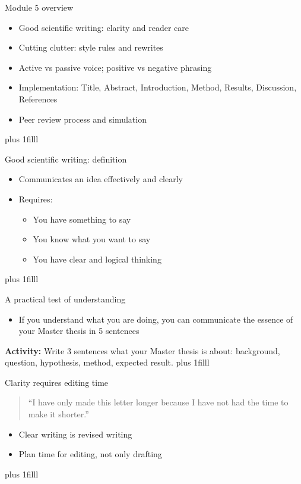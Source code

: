 \documentclass[aspectratio=169]{beamer}
\newcommand{\btVFill}{\vskip0pt plus 1filll}
\newcommand{\Activity}[1]{\textbf{Activity:} #1}
\begin{document}
\begin{frame}{Module 5 overview}
  \begin{itemize}
    \item Good scientific writing: clarity and reader care
    \item Cutting clutter: style rules and rewrites
    \item Active vs passive voice; positive vs negative phrasing
    \item Implementation: Title, Abstract, Introduction, Method, Results, Discussion, References
    \item Peer review process and simulation
  \end{itemize}
  \btVFill
\end{frame}


\begin{frame}{Good scientific writing: definition}
  \begin{itemize}
    \item Communicates an idea effectively and clearly
    \item Requires:
      \begin{itemize}
        \item You have something to say
        \item You know what you want to say
        \item You have clear and logical thinking
      \end{itemize}
  \end{itemize}
  \btVFill
\end{frame}

\begin{frame}{A practical test of understanding}
  \begin{itemize}
    \item If you understand what you are doing, you can communicate the essence of your Master thesis in 5 sentences
  \end{itemize}\bigskip
  \Activity{Write 3 sentences what your Master thesis is about: background, question, hypothesis, method, expected result.}
  \btVFill
\end{frame}

\begin{frame}{Clarity requires editing time}
  \begin{quote}
    ``I have only made this letter longer because I have not had the time to make it shorter.''
  \end{quote}
    \vspace{0.3cm}
  \begin{itemize}
    \item Clear writing is revised writing
    \item Plan time for editing, not only drafting
  \end{itemize}
  \btVFill
\end{frame}
\end{document}
